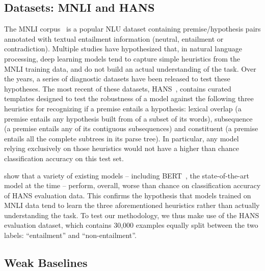 

\subsection{Datasets: MNLI and HANS}
\label{sec:dataset}
The MNLI corpus~\citep{williams2017broad} is a popular NLU dataset containing premise/hypothesis pairs annotated with textual entailment information (neutral, entailment or contradiction). Multiple studies have hypothesized that, in natural language processing, deep learning models tend to capture simple heuristics from the MNLI training data, and do not build an actual understanding of the task. Over the years, a series of diagnostic datasets have been released to test these hypotheses.
The most recent of these datasets, HANS~\citep[Heuristic Analysis for NLI Systems]{linzen2019right}, contains curated templates designed to test the robustness of a model against the following three heuristics for recognizing if a premise entails a hypothesis: lexical overlap (a premise entails any hypothesis built from of a subset of its words), subsequence (a premise entails any of its contiguous subsequences) and constituent (a premise entails all the complete subtrees in its parse tree). In particular, any model relying exclusively on those heuristics would not have a higher than chance classification accuracy on this test set.

\cite{linzen2019right} show that a variety of existing models -- including BERT~\citep{devlin2018bert}, the state-of-the-art model at the time -- perform, overall, worse than chance on classification accuracy of HANS evaluation data. This confirms the hypothesis that models trained on MNLI data tend to learn the three aforementioned heuristics rather than actually understanding the task. To test our methodology, we thus make use of the HANS evaluation dataset, which contains 30,000 examples equally split between the two labels: ``entailment'' and ``non-entailment''.

\subsection{Weak Baselines}

